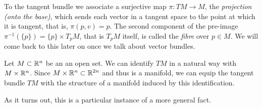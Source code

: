 To the tangent bundle we associate a surjective map $\pi:TM \to M$, the \emph{projection (onto the base)}, which sends each vector in a tangent space to the point at which it is tangent, that is, $\pi(p,v) = p$.
The second component of the pre-image $\pi^{-1}(\{p\}) = \{p\}\times T_pM$, that is $T_pM$ itself, is called the \emph{fibre} over $p\in M$.
We will come back to this later on once we talk about vector bundles.

\begin{example}
  Let $M\subset \mathbb{R}^n$ be an an open set.
  We can identify $TM$ in a natural way with $M\times\mathbb{R}^n$.
  Since $M\times\mathbb{R}^n \subset \mathbb{R}^{2n}$ and thus is a manifold, we can equip the tangent bundle $TM$ with the structure of a manifold induced by this identification.
\end{example}

As it turns out, this is a particular instance of a more general fact.

